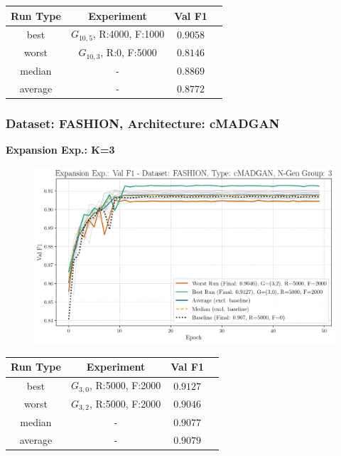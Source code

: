 \begin{table}[H]
	\vspace{-1em}
	\centering
	\begin{tabular}{|c|c|c|c|}
		\hline
		Run Type & Experiment & Val F1 \\ \hline
		best & \(G_{10, 5}\), R:4000, F:1000 & $0.9058$\\ \hline
		worst & \(G_{10, 3}\), R:0, F:5000 & $0.8146$\\ \hline
		median & - & $0.8869$\\ \hline
		average & - & $0.8772$
		\\ \hline
	\end{tabular}
\end{table}
\newpage
\subsubsection{Dataset: FASHION, Architecture: cMADGAN}
\noindent\textbf{Expansion Exp.: K=3}
\begin{figure}[htbp]
	\centering
	\includegraphics[width=.85\textwidth]{abb/strat_classifier_performance/FASHION_STRATIFIED_CLASSIFIERS_cMADGAN_NEW/expansion_experiments/val_f1_score_cMADGAN_FASHION_n_gen_3_all.png}
	\label{fig:app_strat_class_performance_expansion_exp._val_f1_score_3}
\end{figure}
\begin{table}[H]
	\vspace{-1em}
	\centering
	\begin{tabular}{|c|c|c|c|}
		\hline
		Run Type & Experiment & Val F1 \\ \hline
		best & \(G_{3, 0}\), R:5000, F:2000 & $0.9127$\\ \hline
		worst & \(G_{3, 2}\), R:5000, F:2000 & $0.9046$\\ \hline
		median & - & $0.9077$\\ \hline
		average & - & $0.9079$
		\\ \hline
	\end{tabular}
\end{table}
